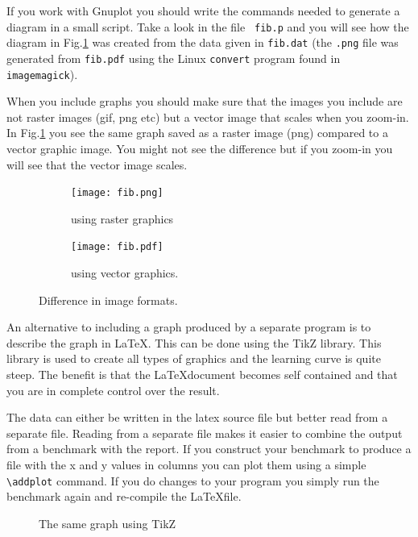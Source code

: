 \documentclass[a4paper,11pt]{article}
\begin{document}
If you work with Gnuplot you should write the commands needed to
generate a diagram in a small script. Take a look in the file {\tt
  fib.p} and you will see how the diagram in Fig.\ref{fig:images} was
created from the data given in {\tt fib.dat} (the {\tt .png} file was
generated from {\tt fib.pdf} using the Linux {\tt convert}
program found in {\tt imagemagick}).

When you include graphs you should make sure that the images you
include are not raster images (gif, png etc) but a vector image that
scales when you zoom-in. In Fig.\ref{fig:images} you see the same
graph saved as a raster image (png) compared to a vector graphic
image. You might not see the difference but if you zoom-in you will
see that the vector image scales.

\begin{figure}[h]
  \centering
  \begin{subfigure}{.5\textwidth}
    \centering
    \texttt{[image: fib.png]}
    \caption{using raster graphics}
  \end{subfigure}%
  \begin{subfigure}{.5\textwidth}
    \centering
    \texttt{[image: fib.pdf]}
    \caption{using vector graphics.}
  \end{subfigure}
  \caption{Difference in image formats.}
  \label{fig:images}
\end{figure}

An alternative to including a graph produced by a separate program is
to describe the graph in \LaTeX. This can be done using the TikZ
library. This library is used to create all types of graphics and the
learning curve is quite steep. The benefit is that the \LaTeX document
becomes self contained and that you are in complete control over the result.

The data can either be written in the latex source file but better read
from a separate file. Reading from a separate file makes it easier to
combine the output from a benchmark with the report. If you construct
your benchmark to produce a file with the x and y values in columns
you can plot them using a simple {\tt \textbackslash addplot}
command. If you do changes to your program you simply run the
benchmark again and re-compile the \LaTeX file.

\begin{figure}
  \centering
  \caption{The same graph using TikZ}
  \label{fig:tikz}
\end{figure}
\end{document}
